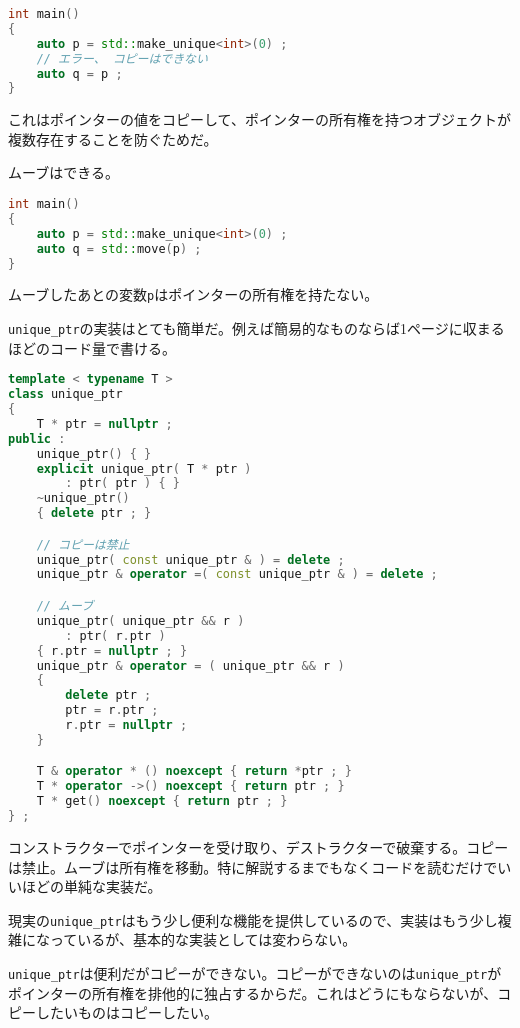 \ifTombow\pagebreak\fi
\begin{lstlisting}[language={C++}]
int main()
{
    auto p = std::make_unique<int>(0) ;
    // エラー、 コピーはできない
    auto q = p ;
}
\end{lstlisting}

これはポインターの値をコピーして、ポインターの所有権を持つオブジェクトが複数存在することを防ぐためだ。

ムーブはできる。

\begin{lstlisting}[language={C++}]
int main()
{
    auto p = std::make_unique<int>(0) ;
    auto q = std::move(p) ;
}
\end{lstlisting}

ムーブしたあとの変数\texttt{p}はポインターの所有権を持たない。

\texttt{unique\_ptr}の実装はとても簡単だ。例えば簡易的なものならば1ページに収まるほどのコード量で書ける。

\begin{lstlisting}[language={C++}]
template < typename T >
class unique_ptr
{
    T * ptr = nullptr ;
public :
    unique_ptr() { }
    explicit unique_ptr( T * ptr )
        : ptr( ptr ) { }
    ~unique_ptr()
    { delete ptr ; }

    // コピーは禁止
    unique_ptr( const unique_ptr & ) = delete ;
    unique_ptr & operator =( const unique_ptr & ) = delete ;

    // ムーブ
    unique_ptr( unique_ptr && r )
        : ptr( r.ptr )
    { r.ptr = nullptr ; }
    unique_ptr & operator = ( unique_ptr && r )
    {
        delete ptr ;
        ptr = r.ptr ;
        r.ptr = nullptr ;
    }

    T & operator * () noexcept { return *ptr ; }
    T * operator ->() noexcept { return ptr ; } 
    T * get() noexcept { return ptr ; }
} ;
\end{lstlisting}

コンストラクターでポインターを受け取り、デストラクターで破棄する。コピーは禁止。ムーブは所有権を移動。特に解説するまでもなくコードを読むだけでいいほどの単純な実装だ。

現実の\texttt{unique\_ptr}はもう少し便利な機能を提供しているので、実装はもう少し複雑になっているが、基本的な実装としては変わらない。


\texttt{unique\_ptr}は便利だがコピーができない。コピーができないのは\texttt{unique\_ptr}がポインターの所有権を排他的に独占するからだ。これはどうにもならないが、コピーしたいものはコピーしたい。

